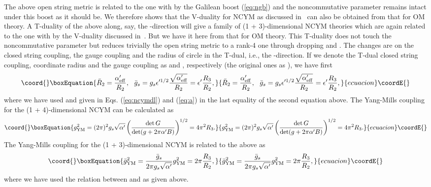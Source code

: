 \documentclass[a4paper,12pt]{article}
\begin{document}
	The above open string metric is related to the one with \coordHE{} by the Galilean boost (\ref{eq:ngb}) and the noncommutative
parameter remains intact under this boost as it should be. We therefore
shows that the V-duality for NCYM as discussed in~\cite{CLW} can also be
obtained from that for OM theory. A T-duality of the above along, say,
the \coordHE{}-direction will give a family of (1 + 3)-dimensional
NCYM theories which are again related to the one with \coordHE{} by
the V-duality discussed in~\cite{CLW}. But we have it here from that for 
OM theory. This T-duality does not touch the noncommutative parameter
but reduces trivially the open string metric to a rank-4 one through
dropping \coordHE{} and \coordHE{}. The changes are on the closed
string coupling, the gauge
coupling and the radius of circle in the T-dual, i.e., the
\coordHE{}-direction. If we denote the T-dual closed string coupling,
coordinate radius
and the gauge coupling as \coordHE{} and \coordHE{}, 
respectively (the original ones as \coordHE{}), we have
first
\begin{equation}\coord{}\boxEquation{
\bar R_2 = \frac{\alpha'_{\rm eff}}{R_2}, \ \  \bar g_s = g_s
\epsilon'^{1/2} \frac{\sqrt{\alpha'_{\rm eff}}}{R_2} = \epsilon'
\frac{R_3}{R_2},
\label{eq:tpr}
}{
\bar R_2 = \frac{\alpha'_{\rm eff}}{R_2}, \ \  \bar g_s = g_s
\epsilon'^{1/2} \frac{\sqrt{\alpha'_{\rm eff}}}{R_2} = \epsilon'
\frac{R_3}{R_2},
}{ecuacion}\coordE{}\end{equation}
where we have used \coordHE{} and \coordHE{} given in Eqs. 
(\ref{eq:ncymdl}) and (\ref{eq:a}) in the last equality of the second
equation above.  The Yang-Mills coupling for the (1 + 4)-dimensional
NCYM can be calculated as
\begin{equation}\coord{}\boxEquation{
g^2_{\rm YM} = (2\pi)^2 g_s \sqrt{\alpha'} \left(\frac{\det G}
{\det(g + 2\pi\alpha' B)}\right)^{1/2} = 4\pi^2 R_3.
}{
g^2_{\rm YM} = (2\pi)^2 g_s \sqrt{\alpha'} \left(\frac{\det G}
{\det(g + 2\pi\alpha' B)}\right)^{1/2} = 4\pi^2 R_3.
}{ecuacion}\coordE{}\end{equation}
The Yang-Mills coupling for the (1 + 3)-dimensional NCYM is related to
the above as
\begin{equation}\coord{}\boxEquation{
\bar g^2_{\rm YM} = \frac{\bar g_s}{2\pi g_s \sqrt{\alpha'}} g^2_{\rm YM}
= 2\pi \frac{R_3}{R_2},
}{
\bar g^2_{\rm YM} = \frac{\bar g_s}{2\pi g_s \sqrt{\alpha'}} g^2_{\rm YM}
= 2\pi \frac{R_3}{R_2},
}{ecuacion}\coordE{}\end{equation}
where we have used the relation between \coordHE{} and \coordHE{} as given above.
\end{document}
